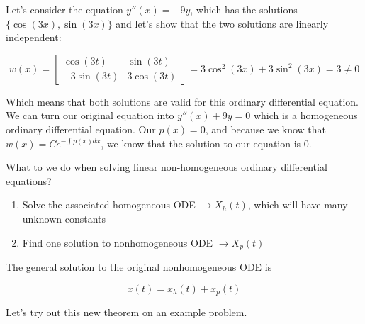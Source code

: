   \begin{eg}
    Let's consider the equation $y''(x)=-9y$, which has the solutions $\{\cos(3x),\sin(3x)\}$ and let's show that the two solutions are linearly independent:

  \[
    w(x)=\begin{bmatrix} \cos(3t)&\sin(3t)\\-3\sin(3t)&3\cos(3t) \end{bmatrix}
    =3\cos^2(3x)+3\sin^2(3x)=3\neq0
  \]
  
  Which means that both solutions are valid for this ordinary differential equation. We can turn our original equation into $y''(x)+9y=0$ which is a homogeneous ordinary differential equation. Our $p(x)=0$, and because we know that $w(x)=Ce^{-\int p(x)dx}$, we know that the solution to our equation is 0.
  \end{eg}

  \begin{theorem}
    What to we do when solving linear non-homogeneous ordinary differential equations?
    \begin{enumerate}
      \item Solve the associated homogeneous ODE $\to X_h(t)$, which will have many unknown constants
      \item Find one solution to nonhomogeneous ODE $\to X_p(t)$
    \end{enumerate}

    The general solution to the original nonhomogeneous ODE is 

    \[
      x(t)=x_h(t)+x_p(t)
    \]
  \end{theorem}

  Let's try out this new theorem on an example problem.

